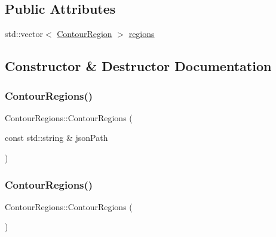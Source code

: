 \subsection*{Public Attributes}
\begin{DoxyCompactItemize}
\item 
std\+::vector$<$ \hyperlink{struct_contour_region}{Contour\+Region} $>$ \hyperlink{struct_contour_regions_a83c5e91699fe55a1306426ddbbcce7b6}{regions}
\end{DoxyCompactItemize}


\subsection{Constructor \& Destructor Documentation}
\mbox{\label{struct_contour_regions_a5e20ac69cb42cdf4831527ca7bca4cca}} 
\subsubsection{\texorpdfstring{Contour\+Regions()}{ContourRegions()}\hspace{0.1cm}{\footnotesize\ttfamily [1/2]}}
{\footnotesize\ttfamily Contour\+Regions\+::\+Contour\+Regions (\begin{DoxyParamCaption}\item[{const std\+::string \&}]{json\+Path }\end{DoxyParamCaption})}

\mbox{\label{struct_contour_regions_a75995164ca89b67bc5b34b59cd532056}} 
\subsubsection{\texorpdfstring{Contour\+Regions()}{ContourRegions()}\hspace{0.1cm}{\footnotesize\ttfamily [2/2]}}
{\footnotesize\ttfamily Contour\+Regions\+::\+Contour\+Regions (\begin{DoxyParamCaption}{ }\end{DoxyParamCaption})}



